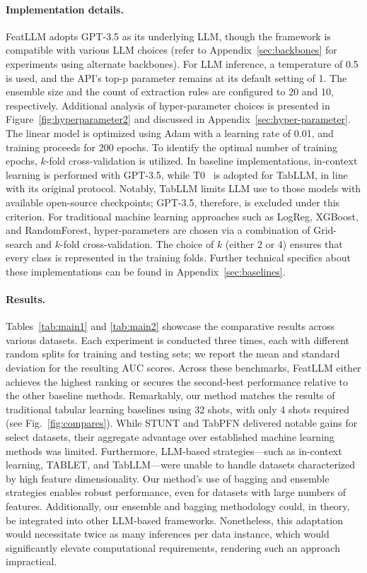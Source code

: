 \paragraph{Implementation details.}
\textsf{FeatLLM} adopts GPT-3.5 as its underlying LLM, though the framework is compatible with various LLM choices (refer to Appendix~\ref{sec:backbones} for experiments using alternate backbones). For LLM inference, a temperature of 0.5 is used, and the API's top-p parameter remains at its default setting of 1. The ensemble size and the count of extraction rules are configured to 20 and 10, respectively. Additional analysis of hyper-parameter choices is presented in Figure~\ref{fig:hyperparameter2} and discussed in Appendix~\ref{sec:hyper-parameter}. The linear model is optimized using Adam with a learning rate of 0.01, and training proceeds for 200 epochs. To identify the optimal number of training epochs, $k$-fold cross-validation is utilized. In baseline implementations, in-context learning is performed with GPT-3.5, while T0~\cite{sanh2022multitask} is adopted for TabLLM, in line with its original protocol. Notably, TabLLM limits LLM use to those models with available open-source checkpoints; GPT-3.5, therefore, is excluded under this criterion. For traditional machine learning approaches such as LogReg, XGBoost, and RandomForest, hyper-parameters are chosen via a combination of Grid-search and $k$-fold cross-validation. The choice of $k$ (either 2 or 4) ensures that every class is represented in the training folds. Further technical specifics about these implementations can be found in Appendix~\ref{sec:baselines}.

\vspace*{-0.12in}
\paragraph{Results.}
Tables~\ref{tab:main1} and \ref{tab:main2} showcase the comparative results across various datasets. Each experiment is conducted three times, each with different random splits for training and testing sets; we report the mean and standard deviation for the resulting AUC scores. Across these benchmarks, \textsf{FeatLLM} either achieves the highest ranking or secures the second-best performance relative to the other baseline methods. Remarkably, our method matches the results of traditional tabular learning baselines using 32 shots, with only 4 shots required (see Fig.~\ref{fig:compares}). While STUNT and TabPFN delivered notable gains for select datasets, their aggregate advantage over established machine learning methods was limited. Furthermore, LLM-based strategies—such as in-context learning, TABLET, and TabLLM—were unable to handle datasets characterized by high feature dimensionality. Our method’s use of bagging and ensemble strategies enables robust performance, even for datasets with large numbers of features. Additionally, our ensemble and bagging methodology could, in theory, be integrated into other LLM-based frameworks. Nonetheless, this adaptation would necessitate twice as many inferences per data instance, which would significantly elevate computational requirements, rendering such an approach impractical.


